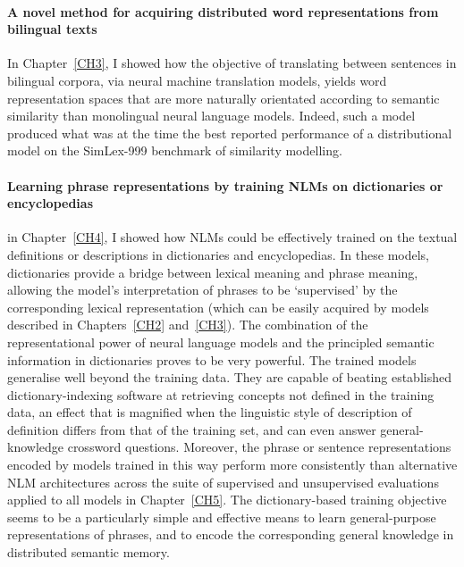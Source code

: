 \paragraph{A novel method for acquiring distributed word representations from bilingual texts} In Chapter~\ref{CH3}, I showed how the objective of translating between sentences in bilingual corpora, via neural machine translation models, yields word representation spaces that are more naturally orientated according to semantic similarity than monolingual neural language models. Indeed, such a model produced what was at the time the best reported performance of a distributional model on the SimLex-999 benchmark of similarity modelling.  

\paragraph{Learning phrase representations by training NLMs on dictionaries or encyclopedias} in Chapter~\ref{CH4}, I showed how NLMs could be effectively trained on the textual definitions or descriptions in dictionaries and encyclopedias. In these models, dictionaries provide a bridge between lexical meaning and phrase meaning, allowing the model's interpretation of phrases to be `supervised' by the corresponding lexical representation (which can be  easily acquired by models described in Chapters~\ref{CH2} and~\ref{CH3}). The combination of the representational power of neural language models and the principled semantic information in dictionaries proves to be very powerful. The trained models generalise well beyond the training data. They are capable of beating established dictionary-indexing software at retrieving concepts not defined in the training data, an effect that is magnified when the linguistic style of description of definition differs from that of the training set, and can even answer general-knowledge crossword questions. Moreover, the phrase or sentence representations encoded by models trained in this way perform more consistently than alternative NLM architectures across the suite of supervised and unsupervised evaluations applied to all models in Chapter~\ref{CH5}. The dictionary-based training objective seems to be a particularly simple and effective means to learn general-purpose representations of phrases, and to encode the corresponding general knowledge in distributed semantic memory. 

